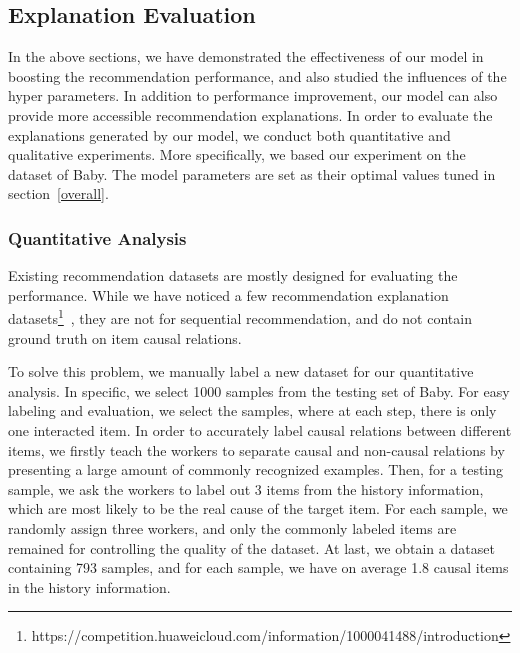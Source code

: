 \documentclass[conference]{IEEEtran}
\theoremstyle{definition}
\theoremstyle{theorem}
\theoremstyle{proof}
\theoremstyle{remark}
\begin{document}
\subsection{Explanation Evaluation}
In the above sections, we have demonstrated the effectiveness of our model in boosting the recommendation performance, and also studied the influences of the hyper parameters.
In addition to performance improvement, our model can also provide more accessible recommendation explanations.
In order to evaluate the explanations generated by our model, we conduct both quantitative and qualitative experiments.
More specifically, we based our experiment on the dataset of Baby.
The model parameters are set as their optimal values tuned in section~\ref{overall}.

\subsubsection{Quantitative Analysis}
Existing recommendation datasets are mostly designed for evaluating the performance.
While we have noticed a few recommendation explanation datasets\footnote{https://competition.huaweicloud.com/information/1000041488/introduction}~\cite{li2021extra}, they are not for sequential recommendation, and do not contain ground truth on item causal relations.

To solve this problem, we manually label a new dataset for our quantitative analysis.
In specific, we select 1000 samples from the testing set of Baby.
For easy labeling and evaluation, we select the samples, where at each step, there is only one interacted item.
In order to accurately label causal relations between different items, we firstly teach the workers to separate causal and non-causal relations by presenting a large amount of commonly recognized examples. 
Then, for a testing sample, we ask the workers to label out 3 items from the history information, which are most likely to be the real cause of the target item. For each sample, we randomly assign three workers, and only the commonly labeled items are remained for controlling the quality of the dataset.
At last, we obtain a dataset containing {793} samples, and for each sample, we have on average {1.8} causal items in the history information.
\end{document}

